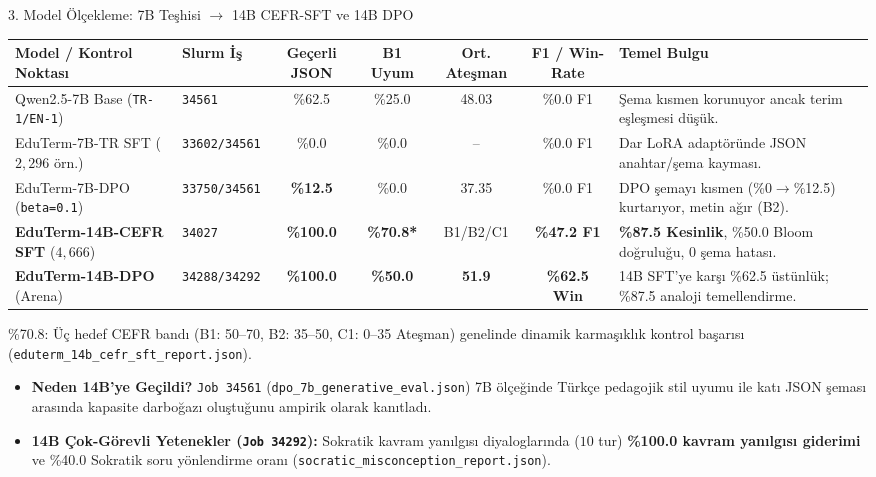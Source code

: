 \documentclass[aspectratio=169,10pt]{beamer}
\begin{document}
\begin{frame}{3. Model Ölçekleme: 7B Teşhisi $\to$ 14B CEFR-SFT ve 14B DPO}
\scriptsize
\begin{table}
\centering
\scriptsize
\begin{tabular}{llccccp{4.6cm}}
\toprule
\textbf{Model / Kontrol Noktası} & \textbf{Slurm İş} & \textbf{Geçerli JSON} & \textbf{B1 Uyum} & \textbf{Ort. Ateşman} & \textbf{F1 / Win-Rate} & \textbf{Temel Bulgu} \\
\midrule
Qwen2.5-7B Base (\texttt{TR-1/EN-1}) & \texttt{34561} & \%62.5 & \%25.0 & 48.03 & \%0.0 F1 & Şema kısmen korunuyor ancak terim eşleşmesi düşük. \\
EduTerm-7B-TR SFT ($2{,}296$ örn.) & \texttt{33602/34561} & \%0.0 & \%0.0 & -- & \%0.0 F1 & Dar LoRA adaptöründe JSON anahtar/şema kayması. \\
EduTerm-7B-DPO (\texttt{beta=0.1}) & \texttt{33750/34561} & \textbf{\%12.5} & \%0.0 & 37.35 & \%0.0 F1 & DPO şemayı kısmen (\%0$\to$\%12.5) kurtarıyor, metin ağır (B2). \\
\midrule
\textbf{EduTerm-14B-CEFR SFT} ($4{,}666$) & \texttt{34027} & \textbf{\%100.0} & \textbf{\%70.8*} & B1/B2/C1 & \textbf{\%47.2 F1} & \textbf{\%87.5 Kesinlik}, \%50.0 Bloom doğruluğu, 0 şema hatası. \\
\textbf{EduTerm-14B-DPO} (Arena) & \texttt{34288/34292} & \textbf{\%100.0} & \textbf{\%50.0} & \textbf{51.9} & \textbf{\%62.5 Win} & 14B SFT'ye karşı \%62.5 üstünlük; \%87.5 analoji temellendirme. \\
\bottomrule
\end{tabular}
\end{table}
\vspace{-0.15cm}
{\tiny *\%70.8: Üç hedef CEFR bandı (B1: 50--70, B2: 35--50, C1: 0--35 Ateşman) genelinde dinamik karmaşıklık kontrol başarısı (\texttt{eduterm\_14b\_cefr\_sft\_report.json}).}

\vspace{0.15cm}
\begin{itemize}
    \item \textbf{Neden 14B'ye Geçildi?} \texttt{Job 34561} (\texttt{dpo\_7b\_generative\_eval.json}) 7B ölçeğinde Türkçe pedagojik stil uyumu ile katı JSON şeması arasında kapasite darboğazı oluştuğunu ampirik olarak kanıtladı.
    \item \textbf{14B Çok-Görevli Yetenekler (\texttt{Job 34292}):} Sokratik kavram yanılgısı diyaloglarında ($10$ tur) \textbf{\%100.0 kavram yanılgısı giderimi} ve \%40.0 Sokratik soru yönlendirme oranı (\texttt{socratic\_misconception\_report.json}).
\end{itemize}
\end{frame}
\end{document}

